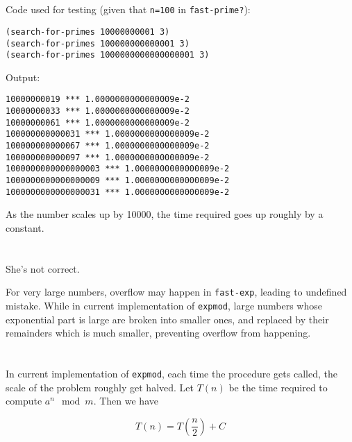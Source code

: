 \documentclass[a4paper]{report}
\begin{document}

\section{}

Code used for testing (given that \lstinline{n=100} in \lstinline{fast-prime?}):

\begin{lstlisting}
(search-for-primes 10000000001 3)
(search-for-primes 100000000000001 3)
(search-for-primes 1000000000000000001 3)
\end{lstlisting}

Output:

\begin{lstlisting}
10000000019 *** 1.0000000000000009e-2
10000000033 *** 1.0000000000000009e-2
10000000061 *** 1.0000000000000009e-2
100000000000031 *** 1.0000000000000009e-2
100000000000067 *** 1.0000000000000009e-2
100000000000097 *** 1.0000000000000009e-2
1000000000000000003 *** 1.0000000000000009e-2
1000000000000000009 *** 1.0000000000000009e-2
1000000000000000031 *** 1.0000000000000009e-2
\end{lstlisting}

As the number scales up by 10000, the time required
 goes up roughly by a constant.


\section{}

She's not correct.

For very large numbers, overflow may happen in \lstinline{fast-exp}, leading to undefined mistake.
 While in current implementation of \lstinline{expmod}, large numbers whose exponential part is
 large are broken into smaller ones, and replaced by their remainders which is much smaller, preventing
 overflow from happening.


\section{}

In current implementation of \lstinline{expmod}, each time the procedure gets called, the scale of the
 problem roughly get halved. Let $T(n)$ be the time required to compute $a^n \mod m$. Then we have

$$
T(n) = T(\frac{n}{2}) + C
$$
\end{document}
